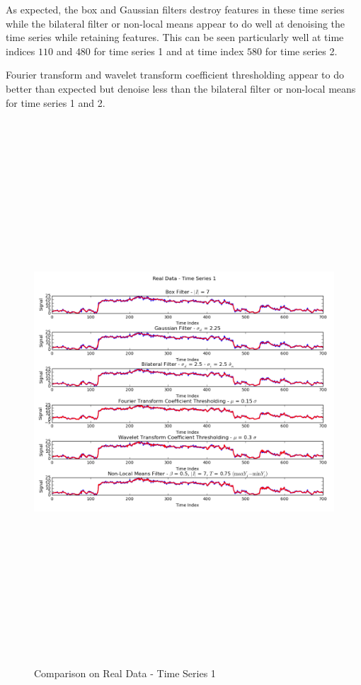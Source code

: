 \documentclass[11pt]{article}
\theoremstyle{definition}
\begin{document}
As expected, the box and Gaussian filters destroy features in these
time series while the bilateral filter or non-local means appear to do
well at denoising the time series while retaining features. This can
be seen particularly well at time indices $110$ and $480$ for time
series 1 and at time index $580$ for time series 2.

Fourier transform and wavelet transform coefficient thresholding
appear to do better than expected but denoise less than the
bilateral filter or non-local means for time series 1 and 2.

\begin{figure}[h!]
\centering
\includegraphics[width = 0.95 \textwidth,height = 8in]{TimeSeries1RealCompare.png}
\caption{Comparison on Real Data - Time Series 1}
\label{timeseries1realcompare}
\end{figure}
\end{document}
